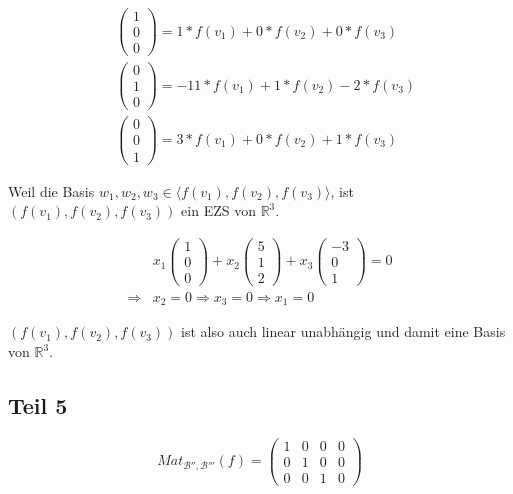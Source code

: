 \documentclass[a4paper,10pt]{article}
\begin{document}
\begin{align}
 & \begin{pmatrix}1\\0\\0\end{pmatrix} = 1 * f(v_1) + 0 * f(v_2) + 0 * f(v_3)\\
 & \begin{pmatrix}0\\1\\0\end{pmatrix} = -11 * f(v_1) + 1 * f(v_2) - 2 * f(v_3)\\
 & \begin{pmatrix}0\\0\\1\end{pmatrix} = 3 * f(v_1) + 0 * f(v_2) + 1 * f(v_3)
\end{align}

Weil die Basis $w_1, w_2, w_3 \in \langle f(v_1), f(v_2), f(v_3) \rangle$, ist $(f(v_1), f(v_2), f(v_3))$ ein EZS von $\mathbb{R}^3$.

\begin{align}
 & x_1\begin{pmatrix}1\\0\\0\end{pmatrix}
 + x_2\begin{pmatrix}5\\1\\2\end{pmatrix}
 + x_3 \begin{pmatrix}-3\\0\\1\end{pmatrix} = 0\\
 \Rightarrow & x_2 = 0 \Rightarrow x_3 = 0 \Rightarrow x_1 = 0
\end{align}

$(f(v_1), f(v_2), f(v_3))$ ist also auch linear unabhängig und damit eine Basis von $\mathbb{R}^3$.

\subsection*{Teil 5}

\begin{equation}
 Mat_{\mathcal{B}'', \mathcal{B}'''}(f) =
   \begin{pmatrix}
    1 & 0 & 0 & 0\\
    0 & 1 & 0 & 0\\
    0 & 0 & 1 & 0
   \end{pmatrix}
\end{equation}
\end{document}
